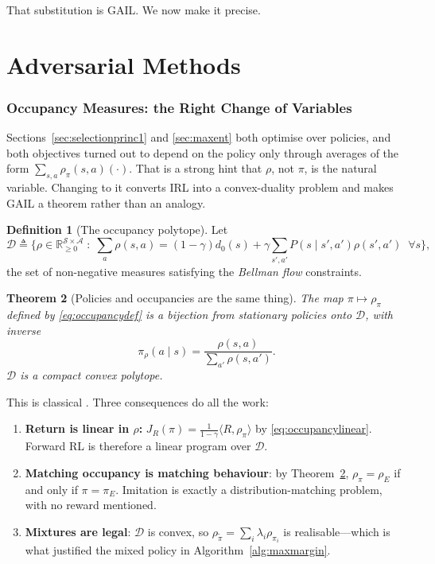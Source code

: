 \documentclass[11pt]{article}
\theoremstyle{plain}
\newtheorem{theorem}{Theorem}[section]
\theoremstyle{definition}
\newtheorem{definition}[theorem]{Definition}
\theoremstyle{remark}
\renewcommand{\S}{\mathcal{S}}
\newcommand{\A}{\mathcal{A}}
\newcommand{\R}{\mathbb{R}}
\begin{document}
That substitution is GAIL. We now make it precise.

\clearpage
\part{Adversarial Methods}\label{part:adversarial}

\section{Occupancy Measures: the Right Change of Variables}
\label{sec:occvar}

Sections~\ref{sec:selectionprinc1} and \ref{sec:maxent} both optimise over
policies, and both objectives turned out to depend on the policy only
through averages of the form $\sum_{s,a}\rho_\pi(s,a)(\cdot)$. That is a
strong hint that $\rho$, not $\pi$, is the natural variable. Changing to it
converts IRL into a convex-duality problem and makes GAIL a theorem rather
than an analogy.

\begin{definition}[The occupancy polytope]
Let
\begin{equation}
\mathcal{D} \triangleq \Big\{\rho\in\R^{\S\times\A}_{\ge0} \;:\;
\sum_a \rho(s,a) = (1-\gamma)d_0(s) + \gamma\sum_{s',a'} P(s\mid
s',a')\rho(s',a') \;\; \forall s\Big\},
\label{eq:occpolytope}
\end{equation}
the set of non-negative measures satisfying the \emph{Bellman flow}
constraints.
\end{definition}

\begin{theorem}[Policies and occupancies are the same
thing]\label{thm:occbijection}
The map $\pi\mapsto\rho_\pi$ defined by \eqref{eq:occupancydef} is a
bijection from stationary policies onto $\mathcal{D}$, with inverse
\begin{equation}
\pi_\rho(a\mid s) = \frac{\rho(s,a)}{\sum_{a'}\rho(s,a')}.
\label{eq:occinverse}
\end{equation}
$\mathcal{D}$ is a compact convex polytope.
\end{theorem}

This is classical \cite{puterman1994,syed2008}. Three consequences do all
the work:
\begin{enumerate}
\item \textbf{Return is linear in $\rho$:} $J_R(\pi) =
\frac1{1-\gamma}\langle R,\rho_\pi\rangle$ by \eqref{eq:occupancylinear}.
Forward RL is therefore a linear program over $\mathcal{D}$.
\item \textbf{Matching occupancy is matching behaviour}: by
Theorem~\ref{thm:occbijection}, $\rho_\pi=\rho_E$ if and only if
$\pi=\pi_E$. Imitation is exactly a distribution-matching problem, with no
reward mentioned.
\item \textbf{Mixtures are legal}: $\mathcal{D}$ is convex, so
$\rho_{\tilde\pi} = \sum_i \lambda_i \rho_{\pi_i}$ is realisable---which is
what justified the mixed policy in Algorithm~\ref{alg:maxmargin}.
\end{enumerate}
\end{document}
